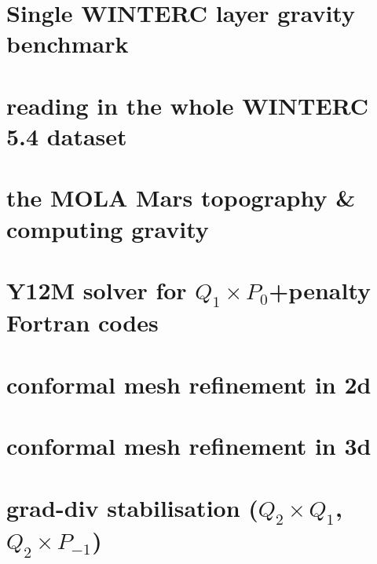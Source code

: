 \documentclass[a4paper,11pt]{report}
\begin{document}
\chapter{Single WINTERC layer gravity benchmark \label{f98}} %

\chapter{reading in the whole WINTERC 5.4 dataset \label{f99}} %

\chapter{the MOLA Mars topography \& computing gravity \label{f100}} %

\chapter{Y12M solver for $Q_1\times P_0$+penalty Fortran codes \label{f101}} %

\chapter{conformal mesh refinement in 2d \label{f102}} %

\chapter{conformal mesh refinement in 3d \label{f103}} %

\chapter{grad-div stabilisation ($Q_2\times Q_1$, $Q_2 \times P_{-1}$) \label{f104}} %
\end{document}
